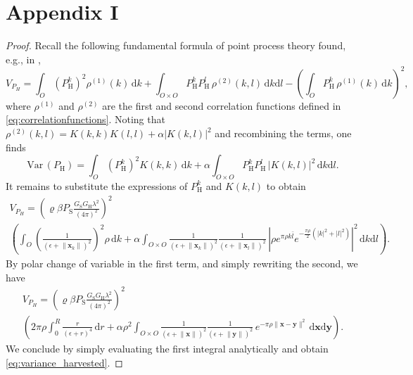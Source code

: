 \documentclass[12pt,draftclsnofoot,onecolumn]{IEEEtran}
\begin{document}
\section*{{\bf Appendix I}}\label{app1}

\begin{proof}
Recall the following fundamental formula of point process theory found, e.g., in \cite{DaleyVereJones},
\begin{equation*}
\label{energy_variance}
V_{P_H}=\int_O\left(P^{k}_{\mathrm{H}}\right)^2\rho^{(1)}(k)\,\mathrm dk+\int_{O\times O}P^{k}_{\mathrm{H}}P^{l}_{\mathrm{H}}\,\rho^{(2)}(k,l)\,\mathrm dk\mathrm dl-\left(\int_OP^{k}_{\mathrm{H}}\,\rho^{(1)}(k)\,\mathrm dk\right)^2,
\end{equation*}
where $\rho^{(1)}$ and $\rho^{(2)}$ are the first and second correlation functions defined in \eqref{eq:correlationfunctions}. Noting that $\rho^{(2)}(k,l)=K(k,k)K(l,l)+\alpha|K(k,l)|^2$ and recombining the terms, one finds
\begin{equation*}
\mathrm{Var}\,\left(P_{\mathrm H}\right)=\int_O\left(P^{k}_{\mathrm{H}}\right)^2K(k,k)\,\mathrm dk+\alpha\int_{O\times O}P^{k}_{\mathrm{H}}P^{l}_{\mathrm{H}}\,|K(k,l)|^2\,\mathrm dk\mathrm dl.
\end{equation*}
It remains to substitute the expressions of $P^{k}_{\mathrm{H}}$ and $K(k,l)$ to obtain
\begin{multline*}
V_{P_H}=\left(\varrho \beta P_{\mathrm{S}} \frac{G_{\mathrm{S}} G_{\mathrm{H}} \lambda^{2}}{(4\pi )^{2}}\right)^2\\
\left(\int_O\left(\frac{1}{\left(\epsilon+\lVert \mathbf x_k\lVert\right)^2}\right)^2\rho\,\mathrm dk+\alpha\int_{O\times O}\frac{1}{\left(\epsilon+\lVert \mathbf x_k\lVert\right)^2}\frac{1}{\left(\epsilon+\lVert \mathbf x_l\lVert\right)^2}\,\left|\rho e^{\pi\rho k\bar{l}} e^{-\frac{\pi\rho}{2}( |k|^2 + |l|^2)}\right|^2\,\mathrm dk\mathrm dl\right).
\end{multline*}
By polar change of variable in the first term, and simply rewriting the second, we have
\begin{multline*}
V_{P_H}=\left(\varrho \beta P_{\mathrm{S}} \frac{G_{\mathrm{S}} G_{\mathrm{H}} \lambda^{2}}{(4\pi )^{2}}\right)^2 \nonumber \\ 
\left(2\pi\rho\int_0^R\frac r{\left(\epsilon+r\right)^4}\,\mathrm dr+\alpha\rho^2\int_{O\times O}\frac{1}{\left(\epsilon+\lVert \mathbf x\lVert\right)^2}\frac{1}{\left(\epsilon+\lVert \mathbf y\lVert\right)^2}\,e^{-\pi\rho\lVert \mathbf x-\mathbf y\lVert^2}\,\mathrm d\mathbf x\mathrm d\mathbf y\right)\!.
\end{multline*}
We conclude by simply evaluating the first integral analytically and obtain \eqref{eq:variance_harvested}.
\end{proof}
\end{document}
